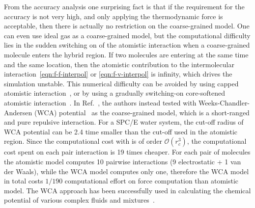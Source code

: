 \documentclass[epjST]{svjour}
\newcommand{\vect}[1]{\textbf{\textit{#1}}}
\newcommand{\mo}[0]{\mathcal {O}}
\newcommand{\AT}[0]{\textrm{AT}}
\newcommand{\HY}[0]{\textrm{HY}}
\begin{document}
From the accuracy analysis one surprising fact is that if the
requirement for the accuracy is not very high, and only applying the
thermodynamic force is acceptable, then there is actually no
restriction on the coarse-grained model. One can even use ideal gas as
a coarse-grained model, but the computational difficulty lies in the
sudden switching on of the atomistic interaction when a coarse-grained
molecule enters the hybrid region. If two molecules are entering at
the same time and the same location, then the atomistic contribution
to the intermolecular interaction~\eqref{eqn:f-f-interpol} or
\eqref{eqn:f-v-interpol} is infinity, which drives the simulation
unstable. This numerical difficulty can be avoided by using capped
atomistic interaction~\cite{praprotnik2005adaptive}, or by using a
gradually switching-on core-softened atomistic
interaction~\cite{heyes2010thermodynamic}.
In Ref.~\cite{wang2013grand}, the authors instead tested with
Weeks-Chandler-Andersen (WCA) potential~\cite{weeks1971role} as the
coarse-grained model, which is a short-ranged and pure repulsive
interaction.  For a SPC/E water system, the cut-off radius of WCA potential
can be 2.4 time smaller than the cut-off used in the atomistic
region. Since the computational cost with is of order $\mo(r_c^3)$,
the computational cost spent on each pair interaction
is 19 times cheaper. For each pair of molecules the atomistic model computes
10 pairwise interactions (9 electrostatic + 1 van der Waals), while the
WCA model computes only one, therefore the WCA model in total costs $1/190$ 
computational effort on force computation than atomistic model.
The WCA approach has been successfully used in calculating the
chemical potential of various complex fluids and mixtures~\cite{agarwal2014chemical}.


\end{document}
